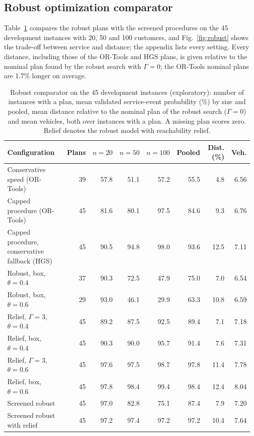 \subsection{Robust optimization comparator}\label{sec:robust}

Table~\ref{tab:robust} compares the robust plans with the screened procedures on the 45 development instances with 20, 50 and 100 customers, and Fig.~\ref{fig:robust} shows the trade-off between service and distance; the appendix lists every setting. Every distance, including those of the OR-Tools and HGS plans, is given relative to the nominal plan found by the robust search with $\Gamma=0$; the OR-Tools nominal plans are 1.7\% longer on average.

\begin{table}[htbp]
\centering
\footnotesize
\caption{Robust comparator on the 45 development instances (exploratory): number of instances with a plan, mean validated service-event probability (\%) by size and pooled, mean distance relative to the nominal plan of the robust search ($\Gamma=0$) and mean vehicles, both over instances with a plan. A missing plan scores zero. Relief denotes the robust model with reachability relief.}
\label{tab:robust}
\begin{tabular}{@{}>{\raggedright\arraybackslash}p{4.6cm}rrrrrrr@{}}
\toprule
Configuration & Plans & $n=20$ & $n=50$ & $n=100$ & Pooled & Dist. (\%) & Veh.\\
\midrule
Conservative speed (OR-Tools) & 39 & 57.8 & 51.1 & 57.2 & 55.5 & 4.8 & 6.56\\
Capped procedure (OR-Tools) & 45 & 81.6 & 80.1 & 97.5 & 84.6 & 9.3 & 6.76\\
Capped procedure, conservative fallback (HGS) & 45 & 90.5 & 94.8 & 98.0 & 93.6 & 12.5 & 7.11\\
Robust, box, $\theta=0.4$ & 37 & 90.3 & 72.5 & 47.9 & 75.0 & 7.0 & 6.54\\
Robust, box, $\theta=0.6$ & 29 & 93.0 & 46.1 & 29.9 & 63.3 & 10.8 & 6.59\\
Relief, $\Gamma=3$, $\theta=0.4$ & 45 & 89.2 & 87.5 & 92.5 & 89.4 & 7.1 & 7.18\\
Relief, box, $\theta=0.4$ & 45 & 90.3 & 90.0 & 95.7 & 91.4 & 7.6 & 7.31\\
Relief, $\Gamma=3$, $\theta=0.6$ & 45 & 97.6 & 97.5 & 98.7 & 97.8 & 11.4 & 7.78\\
Relief, box, $\theta=0.6$ & 45 & 97.8 & 98.4 & 99.4 & 98.4 & 12.4 & 8.04\\
Screened robust & 45 & 97.0 & 82.8 & 75.1 & 87.4 & 7.9 & 7.20\\
Screened robust with relief & 45 & 97.2 & 97.4 & 97.2 & 97.2 & 10.4 & 7.64\\
\bottomrule
\end{tabular}
\end{table}


